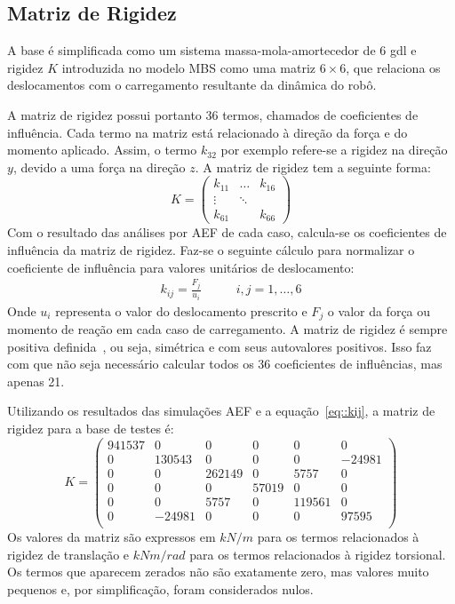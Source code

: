 \subsection{Matriz de Rigidez}

A base é simplificada como um sistema massa-mola-amortecedor de
6 gdl e rigidez $K$ introduzida no modelo MBS como uma matriz $6 \times 6$, que
relaciona os deslocamentos com o carregamento resultante da dinâmica do robô.

A matriz de rigidez possui portanto 36 termos, chamados de coeficientes de
influência. Cada termo na matriz está relacionado à direção da força e do
momento aplicado. Assim, o termo $k_{32}$ por exemplo refere-se a rigidez na
direção $y$, devido a uma força na direção $z$. A matriz de rigidez tem a
seguinte forma:
%
\begin{equation}
K = \begin{pmatrix} 
    k_{11} & \dots 	& k_{16} \\
    \vdots & \ddots & \\
    k_{61} &        & k_{66} 
    \end{pmatrix}
\end{equation}
%
Com o resultado das análises por AEF de cada caso, calcula-se os coeficientes de
influência da matriz de rigidez. Faz-se o
seguinte cálculo para normalizar o coeficiente de influência para valores
unitários de deslocamento:
%
\begin{align} \label{eq::kij}
	k_{ij} = \frac{F_j}{u_{i}} \qquad &  i,j = 1,\ldots,6
\end{align}
%
Onde $u_i$ representa o valor do deslocamento prescrito e $F_j$ o valor da força
ou momento de reação em cada caso de carregamento.
A matriz de rigidez é sempre positiva
definida~\cite{adhikari2004rayleigh}, ou seja, simétrica e com
seus autovalores positivos.
Isso faz com que não seja necessário calcular todos os 36 coeficientes de influências, mas apenas 21. 

Utilizando os resultados das simulações AEF e a equação~\ref{eq::kij}, a matriz
de rigidez para a base de testes é:
%
\begin{equation*}
	K =
\begin{pmatrix}
941537	&	0	&	0	&	0	&	0	&	0 \\
0	&	130543	&	0	&	0	&	0	&	-24981 \\
0	&	0	&	262149	&	0	&	5757	&	0 \\
0	&	0	&	0	&	57019	&	0	&	0 \\
0	&	0	&	5757	&	0	&	119561	&	0 \\
0	&	-24981	&	0	&	0	&	0	&	97595 \\
\end{pmatrix}
\end{equation*}
%
Os valores da matriz são expressos em $kN/m$ para os termos relacionados à
rigidez de translação e $kNm/rad$ para os termos relacionados à rigidez
torsional.
Os termos que aparecem zerados não são exatamente zero, mas valores muito
pequenos e, por simplificação, foram considerados nulos.


